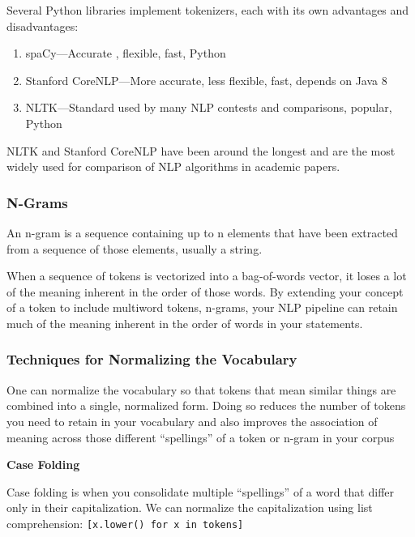 \documentclass[
]{book}
\begin{document}
Several Python libraries implement tokenizers, each with its own advantages and disadvantages:

\begin{enumerate}
\def\labelenumi{\arabic{enumi}.}
\item
  spaCy---Accurate , flexible, fast, Python
\item
  Stanford CoreNLP---More accurate, less flexible, fast, depends on Java 8
\item
  NLTK---Standard used by many NLP contests and comparisons, popular, Python
\end{enumerate}

NLTK and Stanford CoreNLP have been around the longest and are the most widely used for comparison of NLP algorithms in academic papers.

\hypertarget{n-grams}{%
\subsubsection{N-Grams}\label{n-grams}}

An n-gram is a sequence containing up to n elements that have been extracted from a sequence of those elements, usually a string.

When a sequence of tokens is vectorized into a bag-of-words vector, it loses a lot of the meaning inherent in the order of those words. By extending your concept of a token to include multiword tokens, n-grams, your NLP pipeline can retain much of the meaning inherent in the order of words in your statements.

\hypertarget{techniques-for-normalizing-the-vocabulary}{%
\subsubsection{Techniques for Normalizing the Vocabulary}\label{techniques-for-normalizing-the-vocabulary}}

One can normalize the vocabulary so that tokens that mean similar things are combined into a single, normalized form. Doing so reduces the number of tokens you need to retain in your vocabulary and also improves the association of meaning across those different ``spellings'' of a token or n-gram in your corpus

\textbf{Case Folding}

Case folding is when you consolidate multiple ``spellings'' of a word that differ only in their capitalization. We can normalize the capitalization using list comprehension: \texttt{{[}x.lower()\ for\ x\ in\ tokens{]}}
\end{document}
